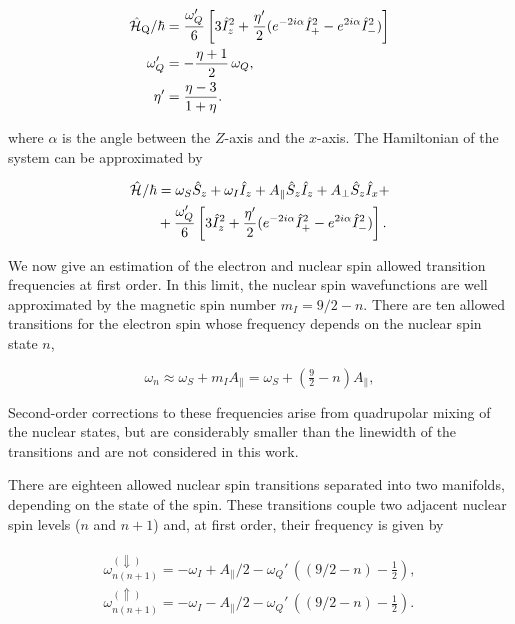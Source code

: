 \begin{align}
\begin{split}
        \hat{\mathcal{H}}_{\text{Q}}/\hbar &= \frac{\omega_Q'}{6} \left[3\hat{I}_{z}^2 + \frac{\eta'}{2}(e^{-2i\alpha}\hat{I}_+^2-e^{2i\alpha}\hat{I}_{-}^2)\right] \\
        \omega_Q' &= -\frac{\eta+1}{2} \, \omega_Q, \\ 
        \eta' &= \frac{\eta-3}{1+\eta}.
\end{split}
\end{align} 

where $\alpha$ is the angle between the $Z$-axis and the $x$-axis. The Hamiltonian of the system can be approximated by 

\begin{align}
\begin{split}
       \hat{\mathcal{H}}_{\text{}}/\hbar &= \omega_S \hat{S}_z + \omega_I \hat{I}_z + A_\parallel \hat{S}_z \hat{I}_z + A_\perp \hat{S}_z \hat{I}_x + \\ 
        &+ \frac{\omega_Q'}{6} \left[3\hat{I}_{z}^2 + \frac{\eta'}{2}(e^{-2i\alpha}\hat{I}_+^2-e^{2i\alpha}\hat{I}_{-}^2)\right].
\end{split}
\end{align}

We now give an estimation of the electron and nuclear spin allowed transition frequencies at first order. In this limit, the nuclear spin wavefunctions are well approximated by the magnetic spin number $m_I = 9/2 - n$. There are ten allowed transitions for the electron spin whose frequency depends on the nuclear spin state $n$,  

\begin{equation}
    \omega_n \approx \omega_S + m_I A_\parallel = \omega_S + \left(\tfrac{9}{2}-n\right) A_\parallel,
\end{equation}

Second-order corrections to these frequencies arise from quadrupolar mixing of the nuclear states, but are considerably smaller than the linewidth of the transitions and are not considered in this work. 

There are eighteen allowed nuclear spin transitions separated into two manifolds, depending on the state of the \Er spin. These transitions couple two adjacent nuclear spin levels ($n$ and $n+1$) and, at first order, their frequency is given by

\begin{align}
\begin{split}
    \omega_{n(n+1)}^{(\Downarrow)} = - \omega_I  + A_\parallel/2 - \omega_Q' \, \left( (9/2 - n) - \tfrac12\right), \\
    \omega_{n(n+1)}^{(\Uparrow)} = - \omega_I  - A_\parallel/2 - \omega_Q' \, \left( (9/2 - n) - \tfrac12\right).
\end{split}
\end{align}

